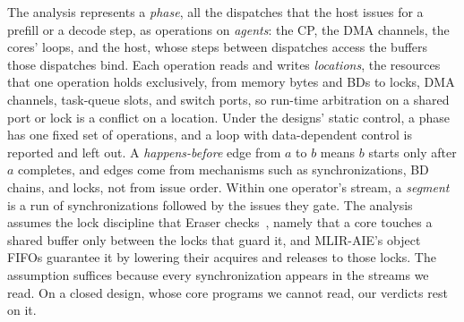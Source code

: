 The analysis represents a \emph{phase}, all the dispatches that the host issues for a prefill or a decode step, as operations on \emph{agents}: the CP, the DMA channels, the cores' loops, and the host, whose steps between dispatches access the buffers those dispatches bind.
Each operation reads and writes \emph{locations}, the resources that one operation holds exclusively, from memory bytes and BDs to locks, DMA channels, task-queue slots, and switch ports, so run-time arbitration on a shared port or lock is a conflict on a location.
Under the designs' static control, a phase has one fixed set of operations, and a loop with data-dependent control is reported and left out.
A \emph{happens-before} edge from $a$ to $b$ means $b$ starts only after $a$ completes, and edges come from mechanisms such as synchronizations, BD chains, and locks, not from issue order.
Within one operator's stream, a \emph{segment} is a run of synchronizations followed by the issues they gate.
The analysis assumes the lock discipline that Eraser checks~\citep{savage1997eraser}, namely that a core touches a shared buffer only between the locks that guard it, and MLIR-AIE's object FIFOs guarantee it by lowering their acquires and releases to those locks.
The assumption suffices because every synchronization appears in the streams we read.
On a closed design, whose core programs we cannot read, our verdicts rest on it.

